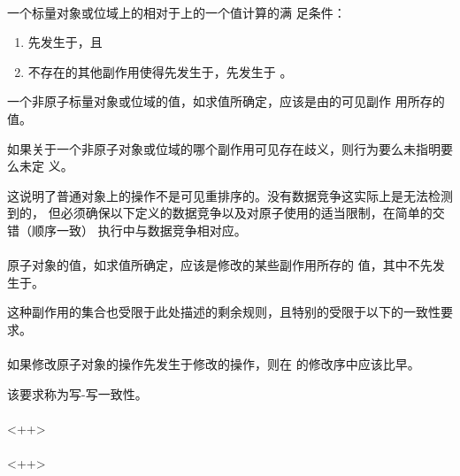 \paragraph{} %
一个标量对象或位域上的相对于上的一个值计算的满
足条件：
\begin{enumerate}
  \item {}先发生于，且
  \item 不存在的其他副作用使得先发生于，先发生于
        。
\end{enumerate}
一个非原子标量对象或位域的值，如求值所确定，应该是由的可见副作
用所存的值。

\begin{note}
  如果关于一个非原子对象或位域的哪个副作用可见存在歧义，则行为要么未指明要么未定
  义。
\end{note}

\begin{note}
  这说明了普通对象上的操作不是可见重排序的。没有数据竞争这实际上是无法检测到的，
  但必须确保以下定义的数据竞争以及对原子使用的适当限制，在简单的交错（顺序一致）
  执行中与数据竞争相对应。
\end{note}

\paragraph{} %
原子对象的值，如求值所确定，应该是修改的某些副作用所存的
值，其中不先发生于。

\begin{note}
  这种副作用的集合也受限于此处描述的剩余规则，且特别的受限于以下的一致性要求。
\end{note}

\paragraph{} %
如果修改原子对象的操作先发生于修改的操作，则在
的修改序中应该比早。

\begin{note}
  该要求称为写-写一致性。
\end{note}

\paragraph{} %
<++>

\paragraph{} %
<++>

